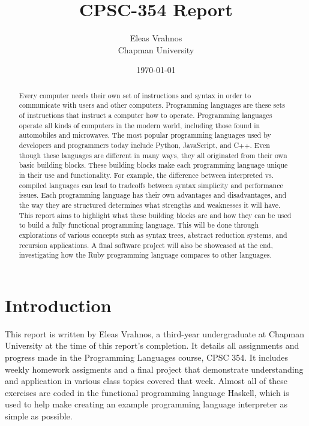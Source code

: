 \documentclass{article}
\title{CPSC-354 Report}
\author{Eleas Vrahnos  \\ Chapman University}
\date{\today}
\theoremstyle{theorem}
\theoremstyle{definition}
\theoremstyle{remark}
\begin{document}
\maketitle

\begin{abstract}
\noindent Every computer needs their own set of instructions and syntax in order to communicate with users and other computers. Programming languages are these sets of instructions that instruct a computer how to operate. Programming languages operate all kinds of computers in the modern world, including those found in automobiles and microwaves. The most popular programming languages used by developers and programmers today include Python, JavaScript, and C++. Even though these languages are different in many ways, they all originated from their own basic building blocks. These building blocks make each programming language unique in their use and functionality. For example, the difference between interpreted vs. compiled languages can lead to tradeoffs between syntax simplicity and performance issues. Each programming language has their own advantages and disadvantages, and the way they are structured determines what strengths and weaknesses it will have. This report aims to highlight what these building blocks are and how they can be used to build a fully functional programming language. This will be done through explorations of various concepts such as syntax trees, abstract reduction systems, and recursion applications. A final software project will also be showcased at the end, investigating how the Ruby programming language compares to other languages.
\end{abstract}

\tableofcontents

\section{Introduction}\label{intro}

This report is written by Eleas Vrahnos, a third-year undergraduate at Chapman University at the time of this report's completion. It details all assignments and progress made in the Programming Languages course, CPSC 354. It includes weekly homework assigments and a final project that demonstrate understanding and application in various class topics covered that week. Almost all of these exercises are coded in the functional programming language Haskell, which is used to help make creating an example programming language interpreter as simple as possible.
\end{document}
